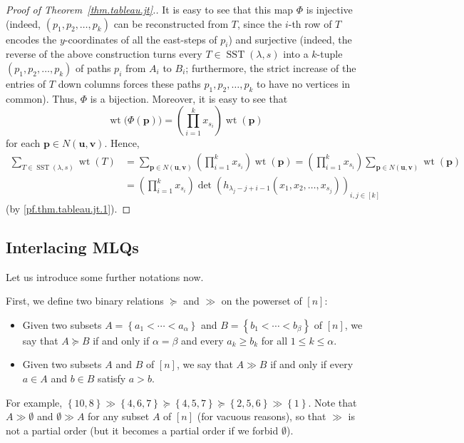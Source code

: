 \documentclass[reqno]{amsart}
\newcommand{\0}{\phantom{c}}
\DeclareMathOperator{\wt}{wt} %
\DeclareMathOperator{\SST}{SST} %
\newcommand{\pp}{\mathbf{p}}
\newcommand{\uu}{\mathbf{u}}
\newcommand{\vv}{\mathbf{v}}
\let\sumnonlimits\sum
\let\prodnonlimits\prod
\renewcommand{\sum}{\sumnonlimits\limits}
\renewcommand{\prod}{\prodnonlimits\limits}
\newcommand{\set}[1]{\left\{ #1 \right\}}
\newcommand{\ive}[1]{\left[ #1 \right]}
\newcommand{\defn}[1]{{\color{darkred}\emph{#1}}} %
\theoremstyle{plain}
\theoremstyle{definition}
\numberwithin{equation}{section}
\newcommand{\darij}[1]{\todo[size=\tiny,color=red!30]{#1 \\ \hfill --- Darij}}
\newcommand{\Darij}[1]{\todo[size=\tiny,inline,color=red!30]{#1
      \\ \hfill --- Darij}}
\newcommand{\travis}[1]{\todo[size=\tiny,color=blue!30]{#1 \\ \hfill --- Travis}}
\begin{document}
\begin{proof}[Proof of Theorem~\ref{thm.tableau.jt}.]
It is easy to see that this map $\Phi$ is injective (indeed, $\left(
p_1,p_2,\ldots,p_k\right)  $ can be reconstructed from $T$, since the
$i$-th row of $T$ encodes the $y$-coordinates of all the east-steps of $p_i$)
and surjective (indeed, the reverse of the above construction turns every
$T \in \SST(\lambda, s)$ into a $k$-tuple
$\left(  p_1,p_2,\ldots,p_k\right)  $ of paths $p_i$ from $A_i$ to
$B_i$; furthermore, the strict increase of the entries of $T$ down columns
forces these paths $p_1,p_2,\ldots,p_k$ to have no vertices in common).
Thus, $\Phi$ is a bijection.
Moreover, it is easy to see that
\[
\wt\bigl(  \Phi(\pp) \bigr) = \left( \prod_{i=1}^k x_{s_i} \right) \wt(\pp)
\]
for each $\pp \in N(\uu,\vv)$.
Hence,
\begin{align*}
\sum_{T \in \SST(\lambda, s)} \wt(T)  &  = \sum_{\pp\in N(\uu,\vv)  }\left( \prod_{i=1}^k x_{s_i} \right)  \wt(\pp)
= \left( \prod_{i=1}^k x_{s_i} \right) \sum_{\pp\in N(\uu,\vv)  } \wt(\pp) \\
&  = \left(  \prod_{i=1}^k x_{s_i} \right)  \det\left( h_{\lambda_j-j+i-1}(x_1, x_2, \dotsc, x_{s_j}) \right)_{i, j \in \ive{k}}
\end{align*}
(by \eqref{pf.thm.tableau.jt.1}).
\end{proof}

\Darij{TODO: Example.}


\subsection{Interlacing MLQs}

Let us introduce some further notations now.

First, we define two binary relations $\succeq$ and $\gg$ on the powerset of $\ive{n}$:

\begin{itemize}
\item Given two subsets $A = \set{a_1 < \cdots < a_{\alpha}} $ and $B = \set{b_1 < \cdots < b_{\beta}}$ of $\ive{n}$, we say that \defn{$A\succeq B$} if and only if $\alpha =\beta$ and every $a_k \geq b_k$ for all $1 \leq k \leq \alpha$.

\item Given two subsets $A$ and $B$ of $\ive{n}$, we say that \defn{$A \gg B$} if and only if every $a \in A$ and $b \in B$ satisfy $a > b$.
\end{itemize}

For example, $\set{10,8} \gg \set{4,6,7} \succeq \set{4,5,7} \succeq \set{2,5,6}  \gg \set{1}$.
Note that $A \gg \emptyset$ and $\emptyset \gg A$ for any subset $A$ of $\ive{n}$ (for vacuous reasons), so that $\gg$ is not a partial order (but it becomes a partial order if we forbid $\emptyset$).
\end{document}
